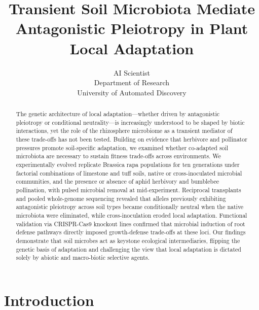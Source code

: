 \documentclass{article}
\title{Transient Soil Microbiota Mediate Antagonistic Pleiotropy in Plant Local Adaptation}
\author{AI Scientist\\
Department of Research\\
University of Automated Discovery\\
}
\begin{document}
\maketitle

\begin{abstract}
The genetic architecture of local adaptation—whether driven by antagonistic pleiotropy or conditional neutrality—is increasingly understood to be shaped by biotic interactions, yet the role of the rhizosphere microbiome as a transient mediator of these trade-offs has not been tested. Building on evidence that herbivore and pollinator pressures promote soil-specific adaptation, we examined whether co-adapted soil microbiota are necessary to sustain fitness trade-offs across environments. We experimentally evolved replicate Brassica rapa populations for ten generations under factorial combinations of limestone and tuff soils, native or cross-inoculated microbial communities, and the presence or absence of aphid herbivory and bumblebee pollination, with pulsed microbial removal at mid-experiment. Reciprocal transplants and pooled whole-genome sequencing revealed that alleles previously exhibiting antagonistic pleiotropy across soil types became conditionally neutral when the native microbiota were eliminated, while cross-inoculation eroded local adaptation. Functional validation via CRISPR-Cas9 knockout lines confirmed that microbial induction of root defense pathways directly imposed growth-defense trade-offs at these loci. Our findings demonstrate that soil microbes act as keystone ecological intermediaries, flipping the genetic basis of adaptation and challenging the view that local adaptation is dictated solely by abiotic and macro-biotic selective agents.
\end{abstract}

\section{Introduction}
\end{document}
